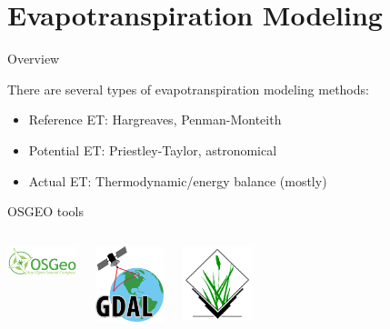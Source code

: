 \documentclass[xcolor=dvipsnames,beamer]{beamer} %
\begin{document}
\section{Evapotranspiration Modeling}
\begin{frame}[fragile]{Overview}

There are several types of evapotranspiration modeling methods:\\

\begin{itemize}
 \item Reference ET: Hargreaves, Penman-Monteith
 \item Potential ET: Priestley-Taylor, astronomical
 \item Actual ET: Thermodynamic/energy balance (mostly)
\end{itemize}

\begin{block}{OSGEO tools}
\begin{columns}[l]
\begin{center}
\includegraphics[width=2cm]{OSGeo_logo}
\end{center}
\begin{center}
\includegraphics[width=2cm]{GDALLogoColor}
\end{center}
\begin{center}
\includegraphics[width=2cm]{Grass_GIS}
\end{center}
\end{columns}
\end{block}
\end{frame}
\end{document}
